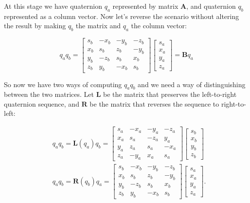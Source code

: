 At this stage we have quaternion $q_{a}$ represented by matrix $\mathbf{A}$, and quaternion $q_{b}$ represented as a column vector. Now let's reverse the scenario without altering the result by making $q_{b}$ the matrix and $q_{a}$ the column vector:

$$
q_{a} q_{b}=\left[\begin{array}{cccc}
s_{b} & -x_{b} & -y_{b} & -z_{b} \\
x_{b} & s_{b} & z_{b} & -y_{b} \\
y_{b} & -z_{b} & s_{b} & x_{b} \\
z_{b} & y_{b} & -x_{b} & s_{b}
\end{array}\right]\left[\begin{array}{c}
s_{a} \\
x_{a} \\
y_{a} \\
z_{a}
\end{array}\right]=\mathbf{B} q_{a}
$$

So now we have two ways of computing $q_{a} q_{b}$ and we need a way of distinguishing between the two matrices. Let $\mathbf{L}$ be the matrix that preserves the left-to-right quaternion sequence, and $\mathbf{R}$ be the matrix that reverses the sequence to right-to-left:

$$
\begin{aligned}
& q_{a} q_{b}=\mathbf{L}\left(q_{a}\right) q_{b}= {\left[\begin{array}{cccc}
s_{a} & -x_{a} & -y_{a} & -z_{a} \\
x_{a} & s_{a} & -z_{a} & y_{a} \\
y_{a} & z_{a} & s_{a} & -x_{a} \\
z_{a} & -y_{a} & x_{a} & s_{a}
\end{array}\right]\left[\begin{array}{c}
s_{b} \\
x_{b} \\
y_{b} \\
z_{b}
\end{array}\right] } \\
& q_{a} q_{b}=\mathbf{R}\left(q_{b}\right) q_{a}=\left[\begin{array}{cccc}
s_{b} & -x_{b} & -y_{b} & -z_{b} \\
x_{b} & s_{b} & z_{b} & -y_{b} \\
y_{b} & -z_{b} & s_{b} & x_{b} \\
z_{b} & y_{b} & -x_{b} & s_{b}
\end{array}\right]\left[\begin{array}{c}
s_{a} \\
x_{a} \\
y_{a} \\
z_{a}
\end{array}\right] .
\end{aligned}
$$

